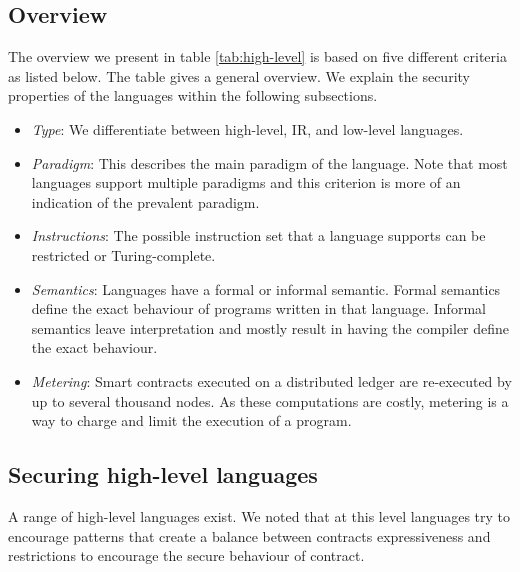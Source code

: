 \subsection{Overview}
The overview we present in table \ref{tab:high-level} is based on five different criteria as listed below. The table gives a general overview. We explain the security properties of the languages within the following subsections.
\begin{itemize}
\item \emph{Type}: We differentiate between high-level, IR, and low-level languages.
\item \emph{Paradigm}: This describes the main paradigm of the language. Note that most languages support multiple paradigms and this criterion is more of an indication of the prevalent paradigm.
\item \emph{Instructions}: The possible instruction set that a language supports can be restricted or Turing-complete.
\item \emph{Semantics}: Languages have a formal or informal semantic. Formal semantics define the exact behaviour of programs written in that language. Informal semantics leave interpretation and mostly result in having the compiler define the exact behaviour.
\item \emph{Metering}: Smart contracts executed on a distributed ledger are re-executed by up to several thousand nodes. As these computations are costly, metering is a way to charge and limit the execution of a program.
\end{itemize}



\subsection{Securing high-level languages}

A range of high-level languages exist. We noted that at this level languages try to encourage patterns that create a balance between contracts expressiveness and restrictions to encourage the secure behaviour of contract.


